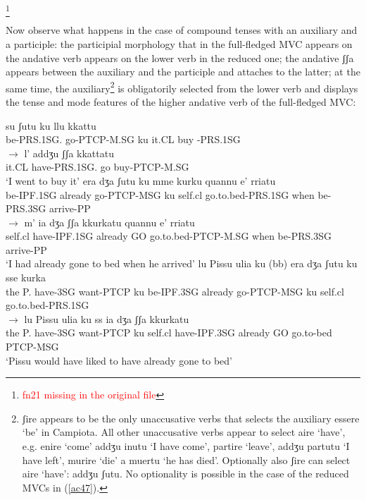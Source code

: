 \documentclass[output=paper]{langscibook}
\begin{document}
\footnote{\textcolor{red}{fn21 missing in the original file}}

Now observe what happens in the case of compound tenses with an auxiliary and a participle: the participial morphology that in the full-fledged MVC appears on the andative verb appears on the lower verb in the reduced one; the andative ʃʃa  appears between the auxiliary and the participle and attaches to the latter; at the same time, the auxiliary\footnote{ʃire appears to be the only unaccusative verbs that selects the auxiliary essere ‘be’ in Campiota.  All other unaccusative verbs appear to select aire ‘have’, e.g. enire ‘come’ addʒu inutu ‘I have come’, partire ‘leave’, addʒu partutu ‘I have left’, murire ‘die’ a muertu ‘he has died’. Optionally also ʃire can select aire ‘have’: addʒu ʃutu.  No optionality is possible in the case of the reduced MVCs in (\ref{ac47}).}  is obligatorily selected from the lower verb and displays the tense and mode features of the higher andative verb of the full-fledged MVC:

\ea\label{ac47}
    \ea \label{ac47a}
        \ea \label{ac47ai}\gll su        ʃutu        ku  llu   kkattu\\
       be-PRS.1SG.    go-PTCP-M.SG  ku   it.CL buy -PRS.1SG\\ 
        \ex \label{ac47aii}$\rightarrow$ \gll l’   addʒu       ʃʃa   kkattatu\\
       it.CL have-PRS.1SG.    go  buy-PTCP-M.SG\\
      \glt ‘I went to buy it’
        \z
    \ex\label{ac47b}
        \ea \label{ac47bi}\gll era      dʒa    ʃutu      ku mme   kurku     quannu  e’       rriatu \\
       be-IPF.1SG already go-PTCP-MSG ku self.cl go.to.bed-PRS.1SG
       when    be-PRS.3SG  arrive-PP\\
        \ex    \label{ac47bii}$\rightarrow$  \gll m’   ia        dʒa   ʃʃa  kkurkatu        quannu  e’        rriatu\\
       self.cl  have-IPF.1SG already GO  go.to.bed-PTCP-M.SG  
       when    be-PRS.3SG  arrive-PP\\
       \glt ‘I had already gone to bed when he arrived’
        \z
    \ex\label{ac47c}
        \ea \label{ac47ci}\gll lu Pissu ulia   ku    (bb) era    dʒa   ʃutu         ku sse    kurka\\
       the P.  have-3SG want-PTCP ku be-IPF.3SG already go-PTCP-MSG    ku self.cl   go.to.bed-PRS.1SG\\
        \ex  \label{ac47cii}  $\rightarrow$ \gll lu Pissu ulia   ku       ss   ia      dʒa         ʃʃa  kkurkatu\\
      the P.  have-3SG want-PTCP ku self.cl  have-IPF.3SG already 
       GO go.to-bed PTCP-MSG\\
      \glt ‘Pissu would have liked to have already gone to bed’
        \z
    \z
\z
\end{document}

